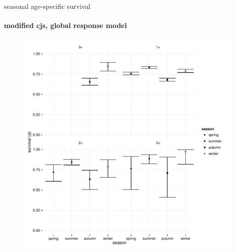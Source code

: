 \documentclass[show notes]{beamer}
\begin{document}
\begin{frame}{seasonal age-specific survival}
  \framesubtitle{modified cjs, global response model}

	\begin{figure}
	\includegraphics[clip, trim=0 0 0 10, height=.8\textheight]{pl-phi-age-x-season.pdf}
  	\end{figure}

\end{frame}
\end{document}
